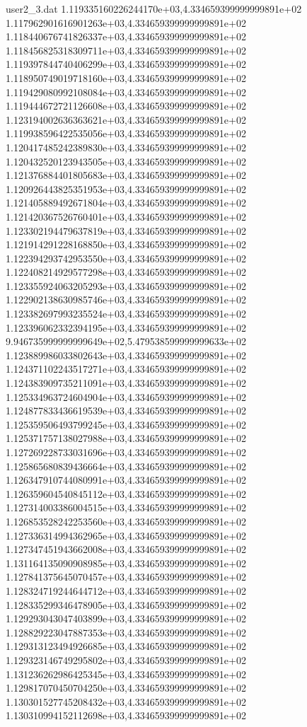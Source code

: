 \begin{filecontents}{user2_3.dat}
1.119335160226244170e+03,4.334659399999999891e+02
1.117962901616901263e+03,4.334659399999999891e+02
1.118440676741826337e+03,4.334659399999999891e+02
1.118456825318309711e+03,4.334659399999999891e+02
1.119397844740406299e+03,4.334659399999999891e+02
1.118950749019718160e+03,4.334659399999999891e+02
1.119429080992108084e+03,4.334659399999999891e+02
1.119444672721126608e+03,4.334659399999999891e+02
1.123194002636363621e+03,4.334659399999999891e+02
1.119938596422535056e+03,4.334659399999999891e+02
1.120417485242389830e+03,4.334659399999999891e+02
1.120432520123943505e+03,4.334659399999999891e+02
1.121376884401805683e+03,4.334659399999999891e+02
1.120926443825351953e+03,4.334659399999999891e+02
1.121405889492671804e+03,4.334659399999999891e+02
1.121420367526760401e+03,4.334659399999999891e+02
1.123302194479637819e+03,4.334659399999999891e+02
1.121914291228168850e+03,4.334659399999999891e+02
1.122394293742953550e+03,4.334659399999999891e+02
1.122408214929577298e+03,4.334659399999999891e+02
1.123355924063205293e+03,4.334659399999999891e+02
1.122902138630985746e+03,4.334659399999999891e+02
1.123382697993235524e+03,4.334659399999999891e+02
1.123396062332394195e+03,4.334659399999999891e+02
9.946735999999999649e+02,5.479538599999999633e+02
1.123889986033802643e+03,4.334659399999999891e+02
1.124371102243517271e+03,4.334659399999999891e+02
1.124383909735211091e+03,4.334659399999999891e+02
1.125334963724604904e+03,4.334659399999999891e+02
1.124877833436619539e+03,4.334659399999999891e+02
1.125359506493799245e+03,4.334659399999999891e+02
1.125371757138027988e+03,4.334659399999999891e+02
1.127269228733031696e+03,4.334659399999999891e+02
1.125865680839436664e+03,4.334659399999999891e+02
1.126347910744080991e+03,4.334659399999999891e+02
1.126359604540845112e+03,4.334659399999999891e+02
1.127314003386004515e+03,4.334659399999999891e+02
1.126853528242253560e+03,4.334659399999999891e+02
1.127336314994362965e+03,4.334659399999999891e+02
1.127347451943662008e+03,4.334659399999999891e+02
1.131164135090908985e+03,4.334659399999999891e+02
1.127841375645070457e+03,4.334659399999999891e+02
1.128324719244644712e+03,4.334659399999999891e+02
1.128335299346478905e+03,4.334659399999999891e+02
1.129293043047403899e+03,4.334659399999999891e+02
1.128829223047887353e+03,4.334659399999999891e+02
1.129313123494926685e+03,4.334659399999999891e+02
1.129323146749295802e+03,4.334659399999999891e+02
1.131236262986425345e+03,4.334659399999999891e+02
1.129817070450704250e+03,4.334659399999999891e+02
1.130301527745208432e+03,4.334659399999999891e+02
1.130310994152112698e+03,4.334659399999999891e+02

\end{filecontents}
